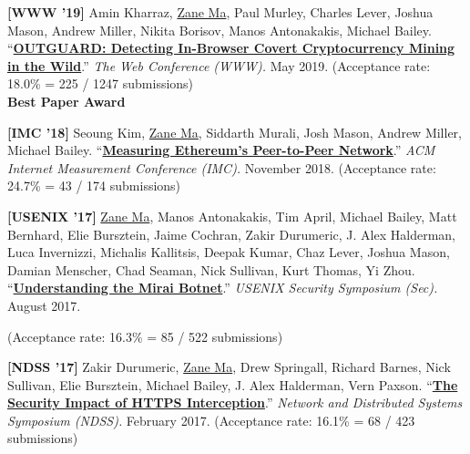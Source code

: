 \documentclass[10pt,singlecolumn]{article} %
\begin{document}
\begin{etaremune}

\item  \textbf{[WWW '19]}
Amin Kharraz, \underline{Zane Ma}, Paul Murley, Charles Lever, Joshua Mason, Andrew Miller, Nikita Borisov, Manos Antonakakis, Michael Bailey. 
``\textbf{\href{https://zanema.com/papers/www19_cryptojacking.pdf}{OUTGUARD: Detecting In-Browser Covert Cryptocurrency Mining in the Wild}}.''
\emph{The Web Conference (WWW).} May 2019.
(Acceptance rate: 18.0\% = 225 / 1247 submissions) \\
\textbf{\color{headings}Best Paper Award} 
\vspace{6pt}


\item \textbf{[IMC '18]}
Seoung Kim, \underline{Zane Ma}, Siddarth Murali, Josh Mason, Andrew Miller, Michael Bailey.
``\textbf{\href{https://zanema.com/papers/imc18_ethpeers.pdf}{Measuring Ethereum's Peer-to-Peer Network}}.''
\emph{ACM Internet Measurement Conference (IMC).} November 2018.
(Acceptance rate: 24.7\% = 43 / 174 submissions)
\vspace{6pt}


\item \textbf{[USENIX '17]}
\underline{Zane Ma}, Manos Antonakakis, Tim April, Michael Bailey, Matt Bernhard, Elie Bursztein, Jaime Cochran, Zakir Durumeric, J. Alex Halderman, Luca Invernizzi, Michalis Kallitsis, Deepak Kumar, Chaz Lever, Joshua Mason, Damian Menscher, Chad Seaman, Nick Sullivan, Kurt Thomas, Yi Zhou.
``\textbf{\href{https://zanema.com/papers/usenix17_mirai.pdf}{Understanding the Mirai Botnet}}.''
\emph{USENIX Security Symposium (Sec).} August 2017.

(Acceptance rate: 16.3\% = 85 / 522 submissions)
\vspace{6pt}


\item \textbf{[NDSS '17]}
Zakir Durumeric, \underline{Zane Ma}, Drew Springall, Richard Barnes, Nick Sullivan, Elie Bursztein, Michael Bailey, J. Alex Halderman, Vern Paxson.
``\textbf{\href{https://zanema.com/papers/ndss17_interception.pdf}{The Security Impact of HTTPS Interception}}.''
\emph{Network and Distributed Systems Symposium (NDSS).} February 2017.
(Acceptance rate: 16.1\% = 68 / 423 submissions)
\vspace{6pt}


\end{etaremune}
\end{document}
